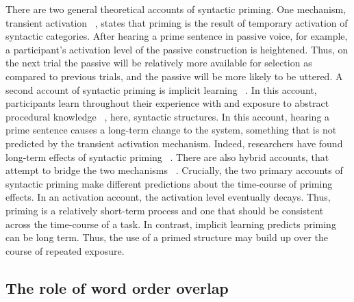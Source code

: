There are two general theoretical accounts of syntactic priming. One mechanism, transient activation ~\citep[e.g.,][]{Collins1975}, states that priming is the result of temporary activation of syntactic categories. After hearing a prime sentence in passive voice, for example, a participant's activation level of the passive construction is heightened. Thus, on the next trial the passive will be relatively more available for selection as compared to previous trials, and the passive will be more likely to be uttered. A second account of syntactic priming is implicit learning ~\citep{Bock2000, Bock2007, Chang2006}. In this account, participants learn throughout their experience with and exposure to abstract procedural knowledge ~\citep[e.g.,][]{Seger1994}, here, syntactic structures. In this account, hearing a prime sentence causes a long-term change to the system, something that is not predicted by the transient activation mechanism. Indeed, researchers have found long-term effects of syntactic priming ~\citep[e.g.,][]{Bock2000}. There are also hybrid accounts, that attempt to bridge the two mechanisms ~\citep[e.g.,][]{Hartsuiker2008, Reitter2011}. Crucially, the two primary accounts of syntactic priming make different predictions about the time-course of priming effects. In an activation account, the activation level eventually decays. Thus, priming is a relatively short-term process and one that should be consistent across the time-course of a task. In contrast, implicit learning predicts priming can be long term. Thus, the use of a primed structure may build up over the course of repeated exposure.

\subsection{The role of word order overlap}
\label{theroleofwordorderoverlap}

